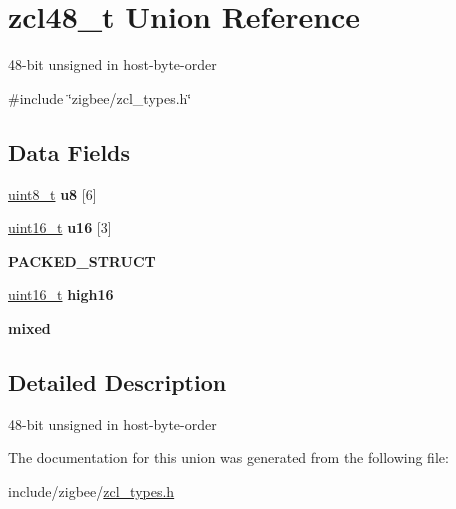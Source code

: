 \hypertarget{unionzcl48__t}{}\section{zcl48\+\_\+t Union Reference}
\label{unionzcl48__t}


48-\/bit unsigned in host-\/byte-\/order  




{\ttfamily \#include \char`\"{}zigbee/zcl\+\_\+types.\+h\char`\"{}}

\subsection*{Data Fields}
\begin{DoxyCompactItemize}
\item 
\hyperlink{group__hal__dos_gae1affc9ca37cfb624959c866a73f83c2}{uint8\+\_\+t} {\bfseries u8} \mbox{[}6\mbox{]}
\item 
\hyperlink{group__hal__dos_ga5a8b2dc9e45a9ee81a94ef304fb62505}{uint16\+\_\+t} {\bfseries u16} \mbox{[}3\mbox{]}
\item 
{\bfseries P\+A\+C\+K\+E\+D\+\_\+\+S\+T\+R\+U\+CT}
\item 
\hyperlink{group__hal__dos_ga5a8b2dc9e45a9ee81a94ef304fb62505}{uint16\+\_\+t} {\bfseries high16}
\item 
{\bfseries mixed}
\end{DoxyCompactItemize}


\subsection{Detailed Description}
48-\/bit unsigned in host-\/byte-\/order 

The documentation for this union was generated from the following file\+:\begin{DoxyCompactItemize}
\item 
include/zigbee/\hyperlink{zcl__types_8h}{zcl\+\_\+types.\+h}\end{DoxyCompactItemize}
